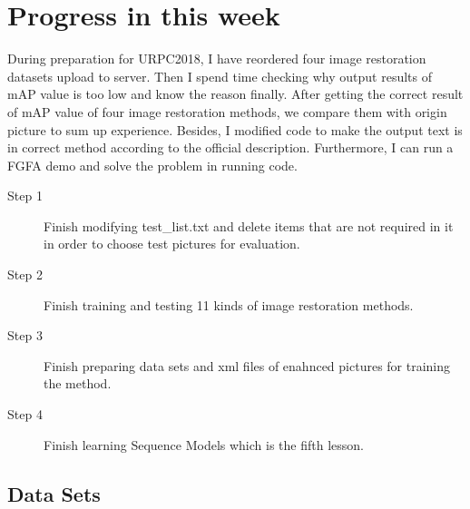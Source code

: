 \documentclass[a4paper]{article}
\begin{document}
\section{Progress in this week}

During preparation for URPC2018, I have reordered four image restoration datasets upload to server. Then I spend time checking why output results of mAP value is too low and know the reason finally. After getting the correct result of mAP value of four image restoration methods, we compare them with origin picture to sum up experience. Besides, I modified code to make the output text is in correct method according to the official description. Furthermore, I can  run a FGFA demo and solve the problem in running code.  
\begin{description}
	\item[Step 1] Finish modifying test\_list.txt and delete items that are not required in it in order to choose test pictures for evaluation.
	\item[Step 2] Finish training and testing 11 kinds of image restoration methods.
	\item[Step 3] Finish preparing data sets and xml files of enahnced pictures for training the method.
	\item[Step 4] Finish learning Sequence Models which is the fifth lesson.\label{t2}
\end{description}

\subsection{Data Sets}
\end{document}
